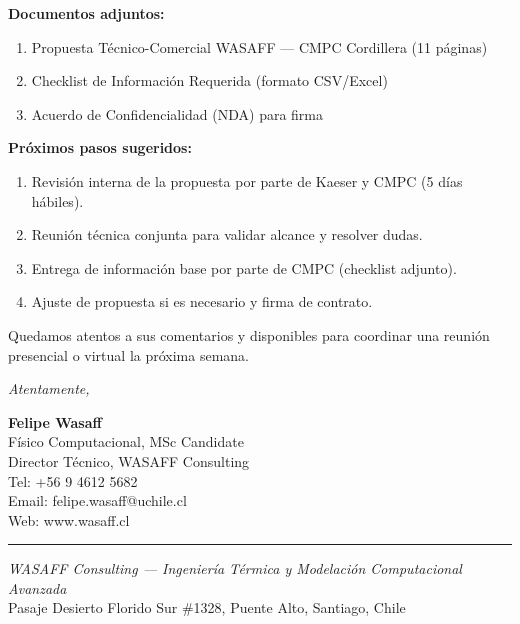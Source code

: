 \documentclass[11pt,a4paper]{article}
\begin{document}
\textbf{Documentos adjuntos:}

\begin{enumerate}
  \item Propuesta Técnico-Comercial WASAFF — CMPC Cordillera (11 páginas)
  \item Checklist de Información Requerida (formato CSV/Excel)
  \item Acuerdo de Confidencialidad (NDA) para firma
\end{enumerate}

\textbf{Próximos pasos sugeridos:}

\begin{enumerate}
  \item Revisión interna de la propuesta por parte de Kaeser y CMPC (5 días hábiles).
  \item Reunión técnica conjunta para validar alcance y resolver dudas.
  \item Entrega de información base por parte de CMPC (checklist adjunto).
  \item Ajuste de propuesta si es necesario y firma de contrato.
\end{enumerate}

Quedamos atentos a sus comentarios y disponibles para coordinar una reunión presencial o virtual la próxima semana.

\vspace{1cm}

\begin{flushright}
\textit{Atentamente,}

\vspace{1cm}

\textbf{Felipe Wasaff}\\
Físico Computacional, MSc Candidate\\
Director Técnico, WASAFF Consulting\\
Tel: +56 9 4612 5682\\
Email: felipe.wasaff@uchile.cl\\
Web: www.wasaff.cl
\end{flushright}

\vspace{1cm}

\begin{center}
\rule{0.8\textwidth}{0.5pt}
\end{center}

\begin{center}
\small\textit{WASAFF Consulting — Ingeniería Térmica y Modelación Computacional Avanzada}\\
\small Pasaje Desierto Florido Sur \#1328, Puente Alto, Santiago, Chile
\end{center}
\end{document}
